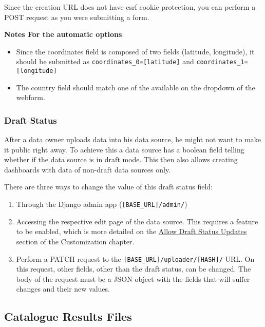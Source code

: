 \documentclass[
]{book}
\providecommand{\tightlist}{%
  \setlength{\itemsep}{0pt}\setlength{\parskip}{0pt}}
\begin{document}
Since the creation URL does not have csrf cookie protection, you can perform a POST request as you were submitting a form.

\textbf{Notes For the automatic options}:

\begin{itemize}
\item
  Since the coordinates field is composed of two fields (latitude, longitude), it should be submitted as \texttt{coordinates\_0={[}latitude{]}} and \texttt{coordinates\_1={[}longitude{]}}
\item
  The country field should match one of the available on the dropdown of the webform.
\end{itemize}

\hypertarget{draft-status}{%
\subsubsection*{Draft Status}\label{draft-status}}

After a data owner uploads data into his data source, he might not want to make it public right away.
To achieve this a data source has a boolean field telling whether if the data source is in draft mode.
This then also allows creating dashboards with data of non-draft data sources only.

There are three ways to change the value of this draft status field:

\begin{enumerate}
\def\labelenumi{\arabic{enumi}.}
\tightlist
\item
  Through the Django admin app (\texttt{{[}BASE\_URL{]}/admin/})
\item
  Accessing the respective edit page of the data source. This requires a feature to be enabled, which is more detailed on the \href{customizations.html\#allow-draft-status-updates}{Allow Draft Status Updates} section of the Customization chapter.
\item
  Perform a PATCH request to the \texttt{{[}BASE\_URL{]}/uploader/{[}HASH{]}/} URL. On this request, other fields, other than the draft status, can be changed. The body of the request must be a JSON object with the fields that will suffer changes and their new values.
\end{enumerate}

\hypertarget{catalogue-results-files}{%
\subsection*{Catalogue Results Files}\label{catalogue-results-files}}
\end{document}
